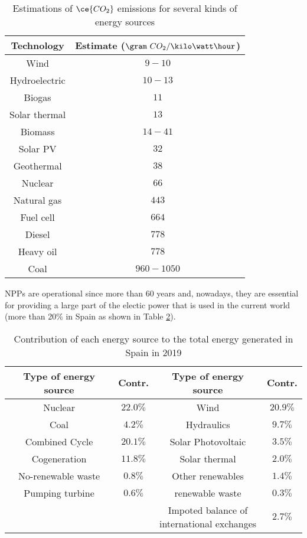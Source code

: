 \begin{table}[htbp]
\begin{center}
\begin{tabular}{|c|c|}
\hline
Technology & Estimate ($\gram~CO_2 /\kilo\watt\hour$)\\
\hline \hline
Wind & $9-10$ \\ \hline
Hydroelectric & $10-13$ \\ \hline
Biogas & $11$ \\ \hline
Solar thermal & $13$ \\ \hline
Biomass & $14-41$ \\ \hline
Solar PV & $32$ \\ \hline
Geothermal & $38$ \\ \hline
Nuclear & $66$ \\ \hline
Natural gas & $443$ \\ \hline
Fuel cell & $664$ \\ \hline
Diesel & $778$ \\ \hline
Heavy oil & $778$ \\ \hline
Coal & $960-1050$ \\ \hline
\end{tabular}
\caption{Estimations of $\ce{CO_2}$ emissions for several kinds of energy sources\cite{ComparationEmissions}}
\label{tab:ComparationEmisions}
\end{center}
\end{table}

NPPs are operational since more than 60 years and, nowadays, they are essential for providing a large part of the electic power that is used in the current world (more than 20\% in Spain as shown in Table \ref{tab:PercentageEnergySpain}). 

\begin{table}[htbp]
\begin{center}
\begin{tabular}{|c|c|c|c|}
\hline
Type of energy source & Contr. & Type of energy source & Contr.  \\
\hline \hline
Nuclear & $22.0\%$ & Wind & $20.9\%$  \\ \hline
Coal & $4.2\%$ & Hydraulics & $9.7\%$  \\ \hline
Combined Cycle & $20.1\%$ & Solar Photovoltaic & $3.5\%$  \\ \hline
Cogeneration & $11.8\%$ & Solar thermal & $2.0\%$  \\ \hline
No-renewable waste & $0.8\%$ & Other renewables & $1.4\%$  \\ \hline
Pumping turbine & $0.6\%$ & renewable waste & $0.3\%$  \\ \hline
 &  & \parbox{11em}{\centering Impoted balance of\\  international exchanges} & $2.7\%$\\ \hline
\end{tabular}
\caption{Contribution of each energy source to the total energy generated in Spain in 2019 \cite{PercentageEnergySpain}}
\label{tab:PercentageEnergySpain}
\end{center}
\end{table}

